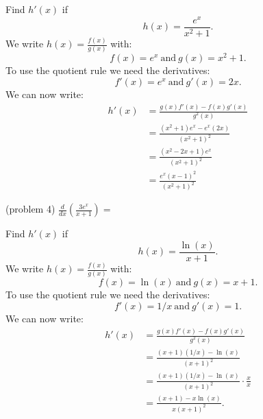 \documentclass[handout]{ximera}
\begin{document}
\begin{example}[example 4]
Find $h'(x)$ if
\[
h(x) = \frac{e^x}{x^2 + 1}.
\]
We write $\displaystyle{h(x) = \frac{f(x)}{g(x)}}$ 
with:
\[f(x) =e^x \ \text{and} \  g(x)= x^2 + 1.\]
To use the quotient rule we need the derivatives:
\[f'(x) = e^x \ \text{and} \  g'(x) =2x.\] 
We can now write: 
\begin{align*}
h'(x) &= \frac{g(x)f'(x) - f(x)g'(x)}{g^2(x)}\\
&= \frac{(x^2+1)e^x - e^x(2x)}{(x^2 + 1)^2} \\
&= \frac{(x^2 - 2x +1)e^x}{(x^2 + 1)^2} \\
&= \frac{e^x(x-1)^2}{(x^2 + 1)^2} 
\end{align*}
\end{example}



\begin{center}
\begin{foldable}
\end{foldable}
\end{center}



\begin{problem}(problem 4)
  $\displaystyle{\frac{d}{dx} \left(\frac{3e^x}{x + 1}\right)=}$\\
  
  \begin{multipleChoice}
  \end{multipleChoice}
\end{problem}



\begin{example}[example 5]
Find $h'(x)$ if
\[
h(x) = \frac{\ln(x)}{x+1}.
\]
We write $\displaystyle{h(x) = \frac{f(x)}{g(x)}}$ 
with:
\[f(x) =\ln(x) \  \text{and} \  g(x)= x+1.\]
To use the quotient rule we need the derivatives:
\[f'(x) =1/x  \ \text{and} \  g'(x) = 1.\]
We can now write: 
\begin{align*}
h'(x) &= \frac{g(x)f'(x) - f(x)g'(x)}{g^2(x)}\\
&= \frac{(x+1)(1/x) - \ln(x)}{(x+1)^2}\\
&= \frac{(x+1)(1/x) - \ln(x)}{(x+1)^2}\cdot \frac{x}{x}\\
&= \frac{(x+1) - x\ln(x)}{x(x+1)^2}.
\end{align*}
\end{example}
\end{document}
